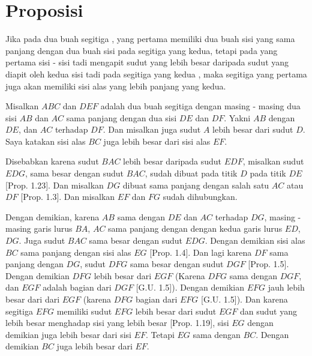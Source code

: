 \documentclass[a4paper]{book}
\begin{document}
\section*{\centering Proposisi \thesection}
Jika pada dua buah segitiga , yang pertama memiliki dua buah sisi yang sama 
panjang  dengan dua buah sisi pada segitiga yang kedua, tetapi pada yang pertama 
sisi - sisi tadi mengapit sudut yang lebih besar daripada sudut yang diapit oleh 
kedua sisi tadi pada segitiga yang kedua , maka segitiga yang pertama juga akan
 memiliki sisi alas yang lebih panjang yang kedua.
\begin{center}
\end{center} 

Misalkan $ABC$ dan $DEF$ adalah dua buah segitiga dengan masing - masing 
dua sisi $AB$ dan $AC$ sama panjang dengan dua sisi $DE$ dan $DF$. Yakni
$AB$ dengan $DE$, dan $AC$ terhadap $DF$. Dan misalkan juga sudut $A$ 
lebih besar dari sudut $D$. Saya katakan sisi alas $BC$ juga lebih besar
dari sisi alas $EF$.

Disebabkan karena sudut $BAC$ lebih besar daripada sudut $EDF$, misalkan
sudut $EDG$, sama besar dengan sudut $BAC$, sudah dibuat pada titik $D$
pada titik $DE$ [Prop. 1.23]. Dan misalkan $DG$ dibuat sama panjang
dengan salah satu $AC$ atau $DF$ [Prop. 1.3]. Dan misalkan $EF$ dan 
$FG$ sudah dihubungkan.

Dengan demikian, karena $AB$ sama dengan $DE$ dan $AC$ terhadap $DG$,
masing - masing garis lurus $BA$, $AC$ sama panjang dengan  dengan
kedua garis lurus $ED$, $DG$. Juga sudut $BAC$ sama besar dengan sudut
$EDG$. Dengan demikian sisi alas $BC$ sama panjang dengan sisi alas
$EG$ [Prop. 1.4]. Dan lagi karena $DF$ sama panjang dengan $DG$, sudut
$DFG$ sama besar dengan sudut $DGF$ [Prop. 1.5]. Dengan demikian $DFG$
lebih besar dari $EGF$ (Karena $DFG$ sama dengan $DGF$, dan $EGF$
adalah bagian dari $DGF$ [G.U. 1.5]). Dengan demikian $EFG$ jauh lebih
besar dari dari $EGF$ (karena $DFG$ bagian dari $EFG$ [G.U. 1.5]). Dan
karena segitiga $EFG$ memiliki sudut $EFG$ lebih besar dari sudut
$EGF$ dan sudut yang lebih besar menghadap sisi yang lebih besar 
[Prop. 1.19], sisi $EG$ dengan demikian juga lebih besar dari
sisi $EF$. Tetapi $EG$ sama dengan $BC$. Dengan demikian $BC$ juga
lebih besar dari $EF$.
\end{document}
